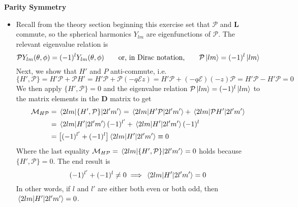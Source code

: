 \documentclass[11pt, a4paper]{article}
\newcommand{\eqtext}[1]{\qquad \text{#1} \qquad}
\renewcommand{\vec}[1]{\bm{#1}} %
\newcommand{\mat}[1]{\mathbf{#1}} %
\newcommand{\E}{\mathcal{E}}  %
\renewcommand{\P}{\mathcal{P}}  %
\begin{document}
\textbf{Parity Symmetry}
\begin{itemize}
	\item Recall from the theory section beginning this exercise set that $ \P $ and $ \vec{L} $ commute, so the spherical harmonics $ Y_{lm} $ are eigenfunctions of $ \P $. The relevant eigenvalue relation is
	\begin{equation*}
		\P Y_{lm}(\theta, \phi) = (-1)^{l}Y_{lm}(\theta, \phi) \eqtext{or, in Dirac notation,} \P\ket{lm} = (-1)^{l}\ket{lm}
	\end{equation*}
	Next, we show that $ H' $ and $ P $ anti-commute, i.e. 
	\begin{equation*}
		\{H', \P \} = H'\P + \P H' = H' \P + \P(-q \E z) = H' \P + (-q\E)(-z)\P  = H' \P - H'\P = 0
	\end{equation*}
	We then apply $ \{H', \P \} = 0 $ and the eigenvalue relation $  \P\ket{lm} = (-1)^{l}\ket{lm} $ to the matrix elements in the $ \mat{D} $ matrix to get
	\begin{align*}
		\mathcal{M}_{H\P} & = \mel{2lm}{\{H', \P\}}{2l'm'} = \mel{2lm}{H' \P}{2l'm'} + \mel{2lm}{\P H'}{2l'm'}\\
		& = \mel{2lm}{H'}{2l'm'} (-1)^{l'} + \mel{2lm}{H'}{2l'm'}(-1)^{l}\\
		& = \big[(-1)^{l'} + (-1)^{l}\big]\mel{2lm}{H'}{2l'm'} \equiv 0
	\end{align*}
	Where the last equality $ \mathcal{M}_{H\P} = \mel{2lm}{\{H', \P\}}{2l'm'} = 0 $ holds because $  \{H', \P \} = 0 $. The end result is
	\begin{equation*}
		(-1)^{l'} + (-1)^{l} \neq 0 \implies \mel{2lm}{H'}{2l'm'} = 0
	\end{equation*}
	In other words, if $ l $ and $ l' $ are either both even or both odd, then $ \mel{2lm}{H'}{2l'm'} = 0 $.
	

\end{itemize}
\end{document}

